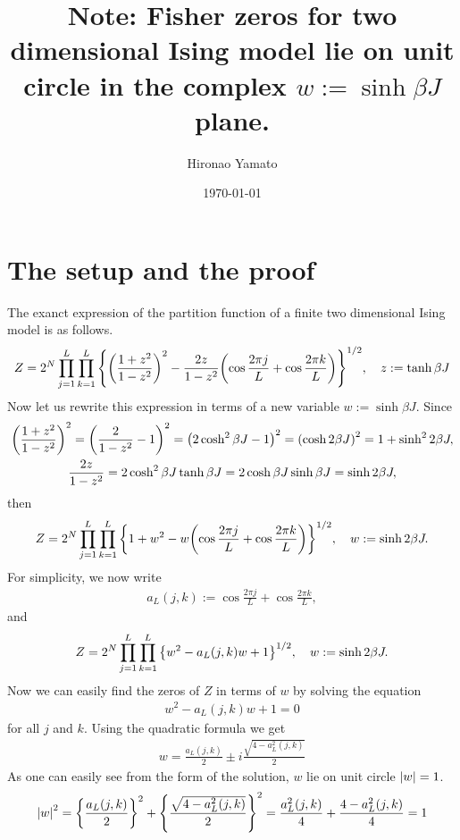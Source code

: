 \documentclass[aps, 12pt]{revtex4-2}
\begin{document}
\title{Note: Fisher zeros for two dimensional Ising model lie on unit circle in the complex $w := \sinh \beta J$ plane.}
\author{Hironao Yamato}
\date{\today}
\maketitle

\section{The setup and the proof}
The exanct expression of the partition function of a finite two dimensional Ising model is as follows.
\begin{align}
  Z = 2^N\prod_{j = 1}^{L} \prod_{k = 1}^{L} \qty{\qty(\frac{1 + z^2}{1 - z^2})^2 - \frac{2z}{1 - z^2}\qty(\cos \frac{2\pi j}{L} + \cos \frac{2\pi k}{L})}^{1/2}, \quad z := \tanh\beta J
\end{align}
Now let us rewrite this expression in terms of a new variable $w := \sinh \beta J$. Since
\begin{gather}
  \qty(\frac{1 + z^2}{1 - z^2})^2 = \qty(\frac{2}{1 - z^2} - 1)^2 = \qty(2\cosh^2 \beta J - 1)^2 = \qty(\cosh 2\beta J)^2 = 1 + \sinh^2 2\beta J, \\
  \frac{2z}{1 - z^2} = 2 \cosh ^2 \beta J \tanh \beta J = 2\cosh \beta J \sinh \beta J = \sinh 2\beta J,
\end{gather}
then
\begin{align}
  Z = 2^N\prod_{j = 1}^{L} \prod_{k = 1}^{L} \qty{1 + w^2 - w\qty(\cos \frac{2\pi j}{L} + \cos \frac{2\pi k}{L})}^{1/2}, \quad w := \sinh 2 \beta J.
\end{align}
For simplicity, we now write
\begin{align}
  a_L(j,k) := \cos \frac{2\pi j}{L} + \cos \frac{2\pi k}{L},
\end{align} 
and 
\begin{align}
  Z = 2^N\prod_{j = 1}^{L} \prod_{k = 1}^{L} \qty{w^2 - a_L(j,k)w + 1}^{1/2}, \quad w := \sinh 2 \beta J.
\end{align}
Now we can easily find the zeros of $Z$ in terms of $w$ by solving the equation
\begin{align}
  w^2 - a_L(j,k)w + 1 = 0
\end{align}
for all $j$ and $k$. Using the quadratic formula we get
\begin{align}
  w = \frac{a_L(j,k)}{2} \pm i \frac{\sqrt{4 - a^2_L(j,k)}}{2}
\end{align}
As one can easily see from the form of the solution, $w$ lie on unit circle $\qty|w| = 1$.
\begin{align}
  \qty|w|^2 = \qty{\frac{a_L(j,k)}{2}}^2 + \qty{\frac{\sqrt{4 - a_L^2(j,k)}}{2}}^2 = \frac{a_L^2(j,k)}{4} + \frac{4 - a^2_L(j,k)}{4} = 1
\end{align}
\end{document}
